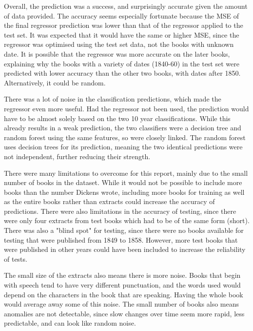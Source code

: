 \documentclass[11pt,a4paper,reqno]{amsart}
\begin{document}
Overall, the prediction was a success, and surprisingly accurate given the amount of data provided. The accuracy seems especially fortunate because the MSE of the final regressor prediction was lower than that of the regressor applied to the test set. It was expected that it would have the same or higher MSE, since the regressor was optimised using the test set data, not the books with unknown date. It is possible that the regressor was more accurate on the later books, explaining why the books with a variety of dates (1840-60) in the test set were predicted with lower accuracy than the other two books, with dates after 1850. Alternatively, it could be random. 

There was a lot of noise in the classification predictions, which made the regressor even more useful. Had the regressor not been used, the prediction would have to be almost solely based on the two 10 year classifications. While this already results in a weak prediction, the two classifiers were a decision tree and random forest using the same features, so were closely linked. The random forest uses decision trees for its prediction, meaning the two identical predictions were not independent, further reducing their strength. 


There were many limitations to overcome for this report, mainly due to the small number of books in the dataset. While it would not be possible to include more books than the number Dickens wrote, including more books for training as well as the entire books rather than extracts could increase the accuracy of predictions. There were also limitations in the accuracy of testing, since there were only four extracts from test books which had to be of the same form (short). There was also a "blind spot" for testing, since there were no books available for testing that were published from 1849 to 1858. However, more test books that were published in other years could have been included to increase the reliability of tests.

The small size of the extracts also means there is more noise. Books that begin with speech tend to have very different punctuation, and the words used would depend on the characters in the book that are speaking. Having the whole book would average away some of this noise. The small number of books also means anomalies are not detectable, since slow changes over time seem more rapid, less predictable, and can look like random noise.
\end{document}
